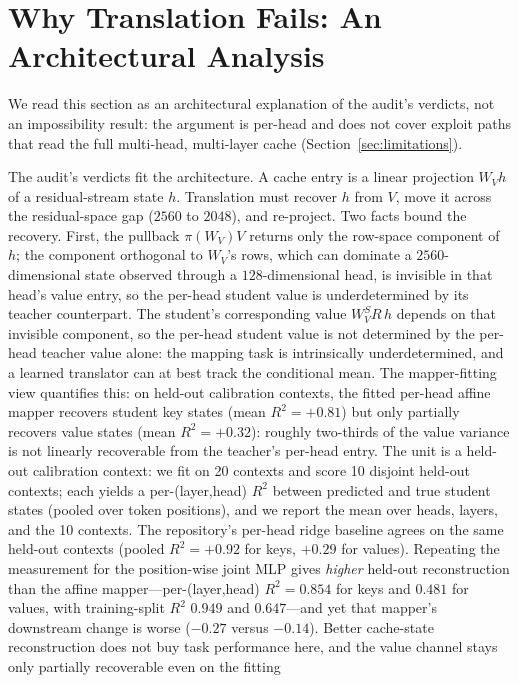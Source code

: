 \documentclass{article} %
\begin{document}
\section{Why Translation Fails: An Architectural Analysis}
\label{sec:why}

We read this section as an architectural explanation of the audit's
verdicts, not an impossibility result: the argument is per-head and
does not cover exploit paths that read the full multi-head,
multi-layer cache (Section~\ref{sec:limitations}).

The audit's verdicts fit the architecture. A cache entry is a linear
projection $W_V h$ of a residual-stream state $h$. Translation must recover
$h$ from $V$, move it across the residual-space gap ($2560$ to $2048$), and
re-project. Two facts bound the recovery. First, the pullback
$\pi(W_V)V$ returns only the row-space component of $h$; the component
orthogonal to $W_V$'s rows, which can dominate a $2560$-dimensional state
observed through a $128$-dimensional head, is invisible in that head's value
entry, so the per-head student value is underdetermined by its teacher
counterpart. The
student's corresponding value $W_V^S R\, h$ depends on that invisible
component, so the per-head student value is not determined by the per-head teacher value alone: the mapping task is
intrinsically underdetermined, and a learned translator can at best track the
conditional mean. The mapper-fitting view quantifies this: on held-out
calibration contexts, the fitted per-head affine mapper recovers student key
states (mean $R^2 = +0.81$) but only partially recovers value states (mean
$R^2 = +0.32$): roughly two-thirds of the value variance is not linearly
recoverable from the teacher's per-head entry. The unit is a held-out
calibration context: we fit on 20 contexts and score 10 disjoint held-out
contexts; each yields a per-(layer,head) $R^2$ between predicted and true
student states (pooled over token positions), and we report the mean over
heads, layers, and the 10 contexts. The repository's per-head ridge baseline
agrees on the same held-out contexts (pooled $R^2 = +0.92$ for keys, $+0.29$
for values). Repeating the measurement for the position-wise joint MLP gives
\emph{higher} held-out reconstruction than the affine mapper---per-(layer,head)
$R^2 = 0.854$ for keys and $0.481$ for values, with training-split $R^2$ $0.949$
and $0.647$---and yet that mapper's downstream change is worse ($-0.27$ versus
$-0.14$). Better cache-state reconstruction does not buy task performance here,
and the value channel stays only partially recoverable even on the fitting
\end{document}
